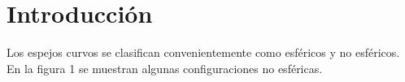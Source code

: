 \documentclass[13,twocolumn,letterpaper]{article}
\begin{document}
\section*{Introducción }
{ 
Los espejos curvos se clasifican convenientemente como esféricos y no esféricos. En la figura 1 se muestran algunas configuraciones no esféricas.
	
	\begin{figure}[h!]
		\centering
		\hspace{1 cm}
		\hspace{1 cm}
		\\

\end{figure}}
\end{document}
